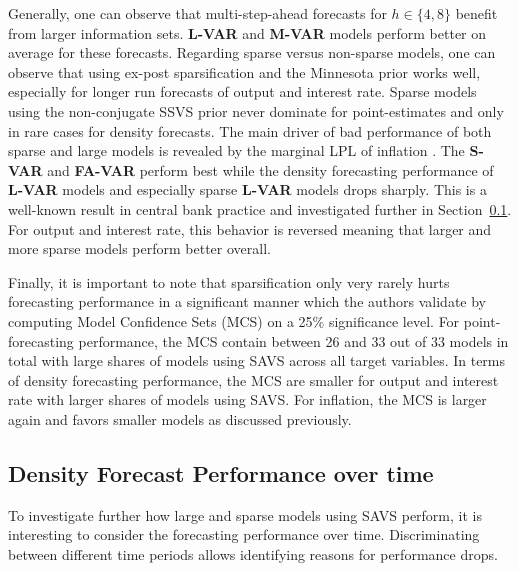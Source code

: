 Generally, one can observe that multi-step-ahead forecasts for $h \in \{ 4 , 8 \}$ benefit from larger information sets. \textbf{L-VAR} and \textbf{M-VAR} models perform better on average for these forecasts. Regarding sparse versus non-sparse models, one can observe that using ex-post sparsification and the Minnesota prior works well, especially for longer run forecasts of output and interest rate. Sparse models using the non-conjugate SSVS prior never dominate for point-estimates and only in rare cases for density forecasts. The main driver of bad performance of both sparse and large models is revealed by the marginal LPL of inflation \parencite[p.~319, Table~4]{hauzenberger_combining_2021}. The \textbf{S-VAR} and \textbf{FA-VAR} perform best while the density forecasting performance of \textbf{L-VAR} models and especially sparse \textbf{L-VAR} models drops sharply. This is a well-known result in central bank practice \parencite{giannone_prior_2015} and investigated further in Section~\ref{subsec:forecasting_over_time}. For output and interest rate, this behavior is reversed meaning that larger and more sparse models perform better overall.

Finally, it is important to note that sparsification only very rarely hurts forecasting performance in a significant manner which the authors validate by computing Model Confidence Sets (MCS) on a 25\% significance level. For point-forecasting performance, the MCS contain between 26 and 33 out of 33 models in total with large shares of models using SAVS across all target variables. In terms of density forecasting performance, the MCS are smaller for output and interest rate with larger shares of models using SAVS. For inflation, the MCS is larger again and favors smaller models as discussed previously.

\subsection{Density Forecast Performance over time}
\label{subsec:forecasting_over_time}
To investigate further how large and sparse models using SAVS perform, it is interesting to consider the forecasting performance over time. Discriminating between different time periods allows identifying reasons for performance drops.

